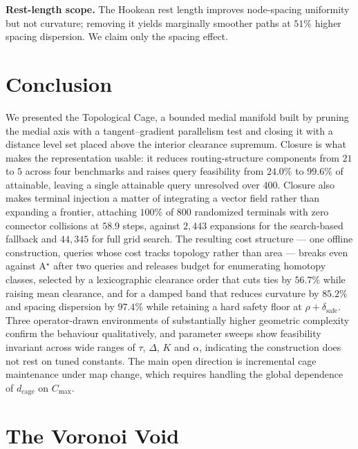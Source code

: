 \documentclass[conference]{IEEEtran}
\begin{document}
\textbf{Rest-length scope.} The Hookean rest length improves node-spacing uniformity but not curvature; removing it yields marginally smoother paths at $51\%$ higher spacing dispersion. We claim only the spacing effect.

\section{Conclusion}

We presented the Topological Cage, a bounded medial manifold built by pruning the medial axis with a tangent--gradient parallelism test and closing it with a distance level set placed above the interior clearance supremum. Closure is what makes the representation usable: it reduces routing-structure components from $21$ to $5$ across four benchmarks and raises query feasibility from $24.0\%$ to $99.6\%$ of attainable, leaving a single attainable query unresolved over $400$. Closure also makes terminal injection a matter of integrating a vector field rather than expanding a frontier, attaching $100\%$ of $800$ randomized terminals with zero connector collisions at $58.9$ steps, against $2{,}443$ expansions for the search-based fallback and $44{,}345$ for full grid search. The resulting cost structure --- one offline construction, queries whose cost tracks topology rather than area --- breaks even against A$^\star$ after two queries and releases budget for enumerating homotopy classes, selected by a lexicographic clearance order that cuts ties by $56.7\%$ while raising mean clearance, and for a damped band that reduces curvature by $85.2\%$ and spacing dispersion by $97.4\%$ while retaining a hard safety floor at $\rho+\delta_{\mathrm{safe}}$. Three operator-drawn environments of substantially higher geometric complexity confirm the behaviour qualitatively, and parameter sweeps show feasibility invariant across wide ranges of $\tau$, $\Delta$, $K$ and $\alpha$, indicating the construction does not rest on tuned constants. The main open direction is incremental cage maintenance under map change, which requires handling the global dependence of $d_{\mathrm{cage}}$ on $C_{\max}$.

\appendices
\section{The Voronoi Void}
\label{appendix:voronoi_void}
\end{document}
